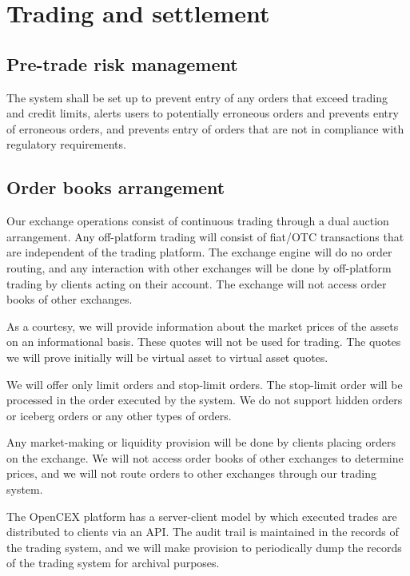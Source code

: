\section{Trading and settlement}
\subsection{Pre-trade risk management}
The system shall be set up to prevent entry of any orders that exceed
trading and credit limits, alerts users to potentially erroneous orders
and prevents entry of erroneous orders, and prevents entry of orders
that are not in compliance with regulatory requirements.

\subsection{Order books arrangement}

Our exchange operations consist of continuous trading through a dual
auction arrangement.  Any off-platform trading will consist of
fiat/OTC transactions that are independent of the trading platform.
The exchange engine will do no order routing, and any interaction with
other exchanges will be done by off-platform trading by clients acting
on their account.  The exchange will not access order books of other
exchanges.

As a courtesy, we will provide information about the market prices of
the assets on an informational basis.  These quotes will not be used
for trading.  The quotes we will prove initially will be virtual asset
to virtual asset quotes.

We will offer only limit orders and stop-limit orders.  The stop-limit
order will be processed in the order executed by the system.  We do
not support hidden orders or iceberg orders or any other types of orders.

Any market-making or liquidity provision will be done by clients
placing orders on the exchange.  We will not access order books of
other exchanges to determine prices, and we will not route orders to
other exchanges through our trading system.

The OpenCEX platform has a server-client model by which executed
trades are distributed to clients via an API.  The audit trail is
maintained in the records of the trading system, and we will make
provision to periodically dump the records of the trading system for
archival purposes.

